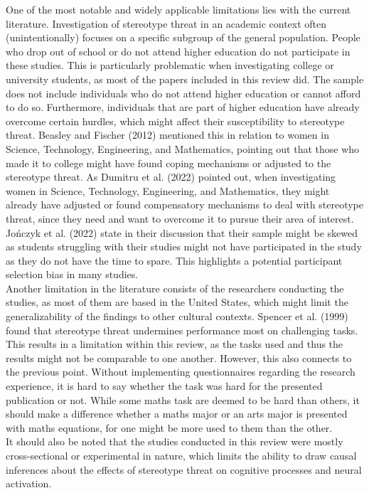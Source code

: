 \documentclass[
  stu, a4paper,floatsintext]{apa7}
\begin{document}
One of the most notable and widely applicable limitations lies with the current literature.
Investigation of stereotype threat in an academic context often (unintentionally) focuses on a specific subgroup of the general population.
People who drop out of school or do not attend higher education do not participate in these studies.
This is particularly problematic when investigating college or university students, as most of the papers included in this review did.
The sample does not include individuals who do not attend higher education or cannot afford to do so.
Furthermore, individuals that are part of higher education have already overcome certain hurdles, which might affect their susceptibility to stereotype threat.
Beasley and Fischer (2012) mentioned this in relation to women in Science, Technology, Engineering, and Mathematics, pointing out that those who made it to college might have found coping mechanisms or adjusted to the stereotype threat. As Dumitru et al. (2022) pointed out, when investigating women in Science, Technology, Engineering, and Mathematics, they might already have adjusted or found compensatory mechanisms to deal with stereotype threat, since they need and want to overcome it to pursue their area of interest.
Jończyk et al. (2022) state in their discussion that their sample might be skewed as students struggling with their studies might not have participated in the study as they do not have the time to spare.
This highlights a potential participant selection bias in many studies.\\
Another limitation in the literature consists of the researchers conducting the studies, as most of them are based in the United States, which might limit the generalizability of the findings to other cultural contexts.
Spencer et al. (1999) found that stereotype threat undermines performance most on challenging tasks.
This results in a limitation within this review, as the tasks used and thus the results might not be comparable to one another.
However, this also connects to the previous point.
Without implementing questionnaires regarding the research experience, it is hard to say whether the task was hard for the presented publication or not.
While some maths task are deemed to be hard than others, it should make a difference whether a maths major or an arts major is presented with maths equations, for one might be more used to them than the other.\\
It should also be noted that the studies conducted in this review were mostly cross-sectional or experimental in nature, which limits the ability to draw causal inferences about the effects of stereotype threat on cognitive processes and neural activation.
\end{document}
